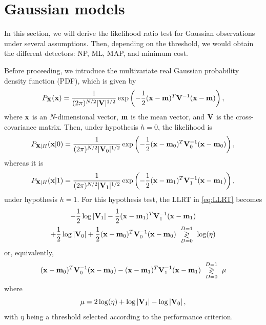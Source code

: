 \section{Gaussian models}

In this section, we will derive the likelihood ratio test for Gaussian observations under several assumptions. Then, depending on the threshold, we would obtain the different detectors: NP, ML, MAP, and minimum cost.

Before proceeding, we introduce the multivariate real Gaussian probability density function (PDF), which is given by
\begin{equation*}
P_{{\bf X}}({\bf x}) = \frac{1}{(2\pi)^{N/2} |{\bf V}|^{1/2}}
\exp\left(-\frac{1}{2}({\bf x}-{\bf m})^T {\bf V}^{-1}({\bf x}-{\bf m})\right),
\label{pXGauss}
\end{equation*}
where ${\bf x}$ is an $N$-dimensional vector, ${\bf m}$ is the mean vector, and ${\bf V}$ is the cross-covariance matrix. Then, under hypothesis $h = 0$, the likelihood is
\begin{equation*}
P_{{\bf X}|H}({\bf x}|0) = \frac{1}{(2\pi)^{N/2} |{\bf V}_0|^{1/2}}
\exp\left(-\frac{1}{2}({\bf x}-{\bf m}_0)^T {\bf V}_0^{-1}({\bf x}-{\bf m}_0)\right),
\end{equation*}
whereas it is
\begin{equation*}
P_{{\bf X}|H}({\bf x}|1) = \frac{1}{(2\pi)^{N/2} |{\bf V}_1|^{1/2}}
\exp\left(-\frac{1}{2}({\bf x}-{\bf m}_1)^T {\bf V}_1^{-1}({\bf x}-{\bf m}_1)\right),
\end{equation*}
under hypothesis $h = 1$. For this hypothesis test, the LLRT in \eqref{eq:LLRT} becomes
\begin{multline*}
- \frac{1}{2}\log\left|{\bf V}_1 \right| 
- \frac{1}{2}({\bf x}-{\bf m}_1)^T {\bf V}_1^{-1}({\bf x}-{\bf m}_1) \\
+ \frac{1}{2}\log\left|{\bf V}_0 \right| 
+ \frac{1}{2}({\bf x}-{\bf m}_0)^T {\bf V}_0^{-1}({\bf x}-{\bf m}_0) 
\,\, \underset{D=0}{\overset{D=1}{\gtrless}}\,\, \log(\eta) 
\end{multline*}
or, equivalently,
\begin{align}
({\bf x}-{\bf m}_0)^T {\bf V}_0^{-1}({\bf x}-{\bf m}_0) 
- ({\bf x}-{\bf m}_1)^T {\bf V}_1^{-1}({\bf x}-{\bf m}_1)
\,\, \underset{D=0}{\overset{D=1}{\gtrless}}\,\, \mu
\label{eq:logLRTGauss}
\end{align}
where
\begin{equation*}
\mu = 2 \log(\eta) + \log\left|{\bf V}_1 \right| - \log\left|{\bf V}_0 \right|,
\end{equation*}
with $\eta$ being a threshold selected according to the performance criterion.

